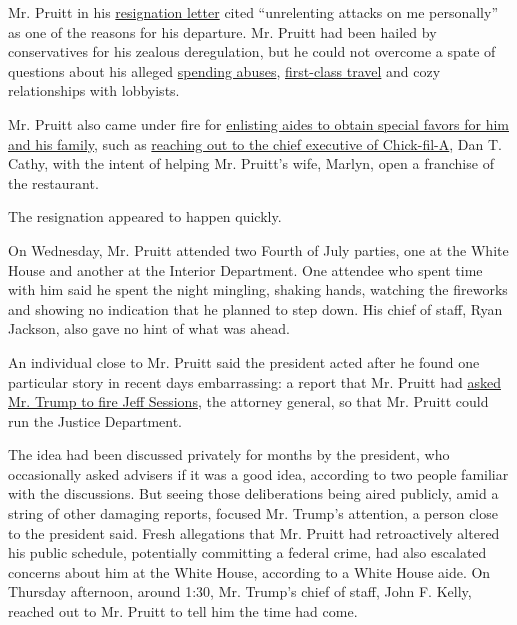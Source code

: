 Mr. Pruitt in his
\href{https://twitter.com/maggieNYT/status/1014965976599875585}{resignation
letter} cited ``unrelenting attacks on me personally'' as one of the
reasons for his departure. Mr. Pruitt had been hailed by conservatives
for his zealous deregulation, but he could not overcome a spate of
questions about his alleged
\href{https://www.nytimes.com/2018/04/12/climate/pruitt-epa-ethics-letter-congress.html}{spending
abuses},
\href{https://www.nytimes.com/2018/02/21/climate/gowdy-pruitt-epa-travel.html}{first-class
travel} and cozy relationships with lobbyists.

Mr. Pruitt also came under fire for
\href{https://www.nytimes.com/2018/06/15/us/politics/scott-pruitt-epa-aides.html?action=click\&module=In\%20Other\%20News\&pgtype=Homepage\&action=click\&module=News\&pgtype=Homepage}{enlisting
aides to obtain special favors for him and his family}, such as
\href{https://www.nytimes.com/2018/06/05/climate/pruitt-epa-chick-fil-a.html}{reaching
out to the chief executive of Chick-fil-A}, Dan T. Cathy, with the
intent of helping Mr. Pruitt's wife, Marlyn, open a franchise of the
restaurant.

The resignation appeared to happen quickly.

On Wednesday, Mr. Pruitt attended two Fourth of July parties, one at the
White House and another at the Interior Department. One attendee who
spent time with him said he spent the night mingling, shaking hands,
watching the fireworks and showing no indication that he planned to step
down. His chief of staff, Ryan Jackson, also gave no hint of what was
ahead.

An individual close to Mr. Pruitt said the president acted after he
found one particular story in recent days embarrassing: a report that
Mr. Pruitt had
\href{https://www.cnn.com/2018/07/03/politics/scott-pruitt-jeff-sessions-trump/index.html}{asked
Mr. Trump to fire Jeff Sessions}, the attorney general, so that Mr.
Pruitt could run the Justice Department.

The idea had been discussed privately for months by the president, who
occasionally asked advisers if it was a good idea, according to two
people familiar with the discussions. But seeing those deliberations
being aired publicly, amid a string of other damaging reports, focused
Mr. Trump's attention, a person close to the president said. Fresh
allegations that Mr. Pruitt had retroactively altered his public
schedule, potentially committing a federal crime, had also escalated
concerns about him at the White House, according to a White House aide.
On Thursday afternoon, around 1:30, Mr. Trump's chief of staff, John F.
Kelly, reached out to Mr. Pruitt to tell him the time had come.

